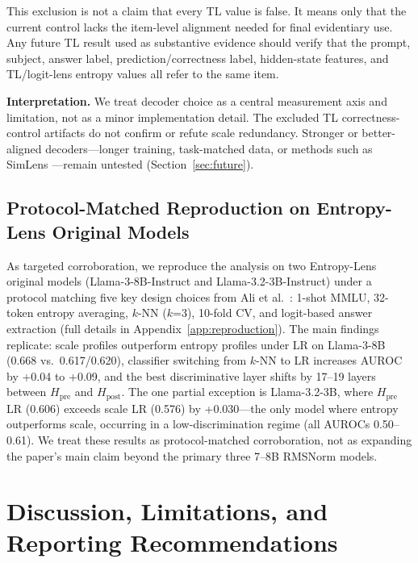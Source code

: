 \documentclass{ieeeaccess}
\newcommand{\Hpre}{H_{\text{pre}}}
\newcommand{\Hpost}{H_{\text{post}}}
\begin{document}
This exclusion is not a claim that every TL value is false. It means only that the current control lacks the item-level alignment needed for final evidentiary use. Any future TL result used as substantive evidence should verify that the prompt, subject, answer label, prediction/correctness label, hidden-state features, and TL/logit-lens entropy values all refer to the same item.

\textbf{Interpretation.} We treat decoder choice as a central measurement axis and limitation, not as a minor implementation detail. The excluded TL correctness-control artifacts do not confirm or refute scale redundancy. Stronger or better-aligned decoders---longer training, task-matched data, or methods such as SimLens \cite{ma2025simlens}---remain untested (Section~\ref{sec:future}).

\subsection{Protocol-Matched Reproduction on Entropy-Lens Original Models}
\label{sec:reproduction}

As targeted corroboration, we reproduce the analysis on two Entropy-Lens original models (Llama-3-8B-Instruct and Llama-3.2-3B-Instruct) under a protocol matching five key design choices from Ali et al.\ \cite{ali2025entropylens}: 1-shot MMLU, 32-token entropy averaging, $k$-NN ($k$=3), 10-fold CV, and logit-based answer extraction (full details in Appendix~\ref{app:reproduction}). The main findings replicate: scale profiles outperform entropy profiles under LR on Llama-3-8B (0.668 vs.\ 0.617/0.620), classifier switching from $k$-NN to LR increases AUROC by +0.04 to +0.09, and the best discriminative layer shifts by 17--19 layers between $\Hpre$ and $\Hpost$. The one partial exception is Llama-3.2-3B, where $\Hpre$ LR (0.606) exceeds scale LR (0.576) by +0.030---the only model where entropy outperforms scale, occurring in a low-discrimination regime (all AUROCs 0.50--0.61). We treat these results as protocol-matched corroboration, not as expanding the paper's main claim beyond the primary three 7--8B RMSNorm models.


\FloatBarrier
\section{Discussion, Limitations, and Reporting Recommendations}
\label{sec:discussion}
\end{document}
